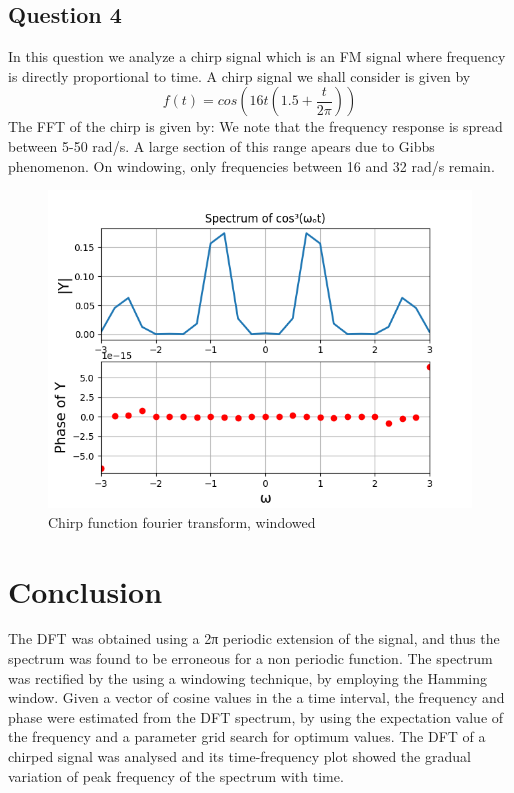 \documentclass[11pt, a4paper]{article}
\begin{document}
\subsection{Question 4}
In this question we analyze a chirp signal which is an FM signal where frequency is directly proportional to time.
A chirp signal we shall consider is given by 
\begin{equation}
    f(t) = cos(16t(1.5 + \frac{t}{2\pi}))
\end{equation}
The FFT of the chirp is given by:
We note that the frequency response is spread between 5-50 rad/s. A large section of this range apears due to Gibbs phenomenon. On windowing, only frequencies between 16 and 32 rad/s remain.
\begin{figure}[h!]
\centering
\includegraphics[scale=0.6]{10-8_Window.png}
\caption{Chirp function fourier transform, windowed}
\label{fig:universe}
\end{figure}

\section{Conclusion}
The DFT was obtained using a 2π periodic extension of the signal, and thus
the spectrum was found to be erroneous for a non periodic function. The
spectrum was rectified by the using a windowing technique, by employing the
Hamming window. Given a vector of cosine values in the a time interval, the
frequency and phase were estimated from the DFT spectrum, by using the
expectation value of the frequency and a parameter grid search for optimum
values. The DFT of a chirped signal was analysed and its time-frequency
plot showed the gradual variation of peak frequency of the spectrum with
time.
\end{document}
